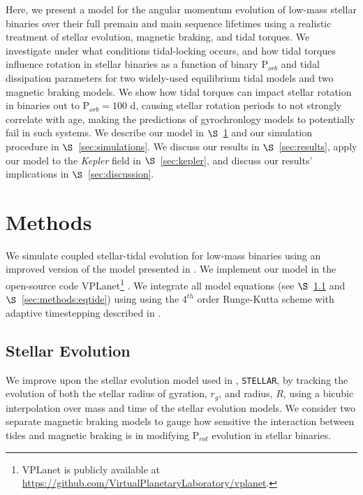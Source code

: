 \documentclass[twocolumn]{aastex61}
\newcommand{\stellar}[0]{\texttt{STELLAR}\xspace}
\newcommand{\kepler}[0]{\textit{Kepler}\xspace}
\begin{document}
Here, we present a model for the angular momentum evolution of low-mass stellar binaries over their full premain and main sequence lifetimes using a realistic treatment of stellar evolution, magnetic braking, and tidal torques. We investigate under what conditions tidal-locking occurs, and how tidal torques influence rotation in stellar binaries as a function of binary P$_{orb}$ and tidal dissipation parameters for two widely-used equilibrium tidal models and two magnetic braking models.  We show how tidal torques can impact stellar rotation in binaries out to P$_{orb} = 100$ d, causing stellar rotation periods to not strongly correlate with age, making the predictions of gyrochronlogy models to potentially fail in such systems.  We describe our model in $\S$~\ref{sec:methods} and our simulation procedure in $\S$~\ref{sec:simulations}.  We discuss our results in $\S$~\ref{sec:results}, apply our model to the \kepler field in $\S$~\ref{sec:kepler}, and discuss our results' implications in $\S$~\ref{sec:discussion}.


\section{Methods} \label{sec:methods}

We simulate coupled stellar-tidal evolution for low-mass binaries using an improved version of the model presented in \citet{Fleming2018}.  We implement our model in the open-source code VPLanet\footnote{VPLanet is publicly available
at \href{https://github.com/VirtualPlanetaryLaboratory/vplanet}{{https://github.com/VirtualPlanetaryLaboratory/vplanet}}.} \citep[][Barnes et al., in prep]{Barnes2016,vplanet2018}.  We integrate all model equations (see $\S$~\ref{sec:methods:stellar} and $\S$~\ref{sec:methods:eqtide}) using using the $4^{th}$ order Runge-Kutta scheme with adaptive timestepping described in \citet{Fleming2018}.  

\subsection{Stellar Evolution} \label{sec:methods:stellar}

We improve upon the stellar evolution model used in \citet{Fleming2018}, \stellar, by tracking the evolution of both the stellar radius of gyration, $r_g$, and radius, $R$, using a bicubic interpolation over mass and time of the \citet{Baraffe2015} stellar evolution models. We consider two separate magnetic braking models to gauge how sensitive the interaction between tides and magnetic braking is in modifying P$_{rot}$ evolution in stellar binaries. 
\end{document}
